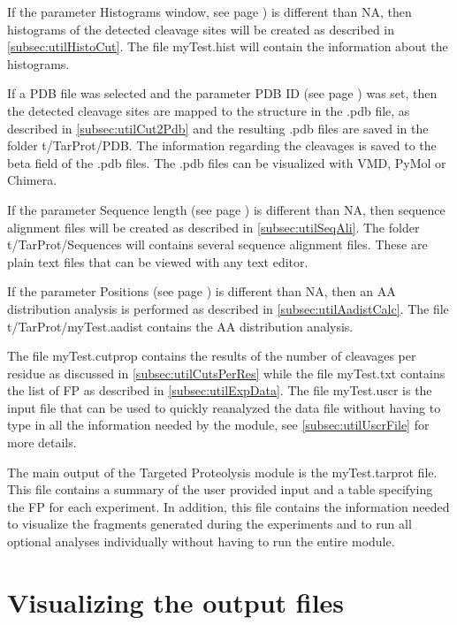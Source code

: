 If the parameter Histograms window, see page \pageref{par:tarprotHist}) is different than NA, then histograms of the detected cleavage sites will be created as described in \autoref{subsec:utilHistoCut}. The file myTest.hist will contain the information about the histograms.

If a PDB file was selected and the parameter PDB ID  (see page \pageref{par:tarprotPdbID}) was set, then the detected cleavage sites are mapped to the structure in the .pdb file, as described in \autoref{subsec:utilCut2Pdb} and the resulting .pdb files are saved in the folder t/TarProt/PDB. The information regarding the cleavages is saved to the beta field of the .pdb files. The .pdb files can be visualized with VMD, PyMol or Chimera. 
  
If the parameter Sequence length (see page \pageref{par:tarprotSeqL}) is different than NA, then sequence alignment files will be created as described in \autoref{subsec:utilSeqAli}. The folder t/TarProt/Sequences will contains several sequence alignment files. These are plain text files that can be viewed with any text editor.

If the parameter Positions (see page \pageref{par:tarprotPos}) is different than NA, then an AA distribution analysis is performed as described in \autoref{subsec:utilAadistCalc}. The file t/TarProt/myTest.aadist contains the AA distribution analysis.

The file myTest.cutprop contains the results of the number of cleavages per residue as discussed in \autoref{subsec:utilCutsPerRes} while the file myTest.txt contains the list of FP as described in \autoref{subsec:utilExpData}. The file myTest.uscr is the input file that can be used to quickly reanalyzed the data file without having to type in all the information needed by the module, see \autoref{subsec:utilUscrFile} for more details. 

The main output of the Targeted Proteolysis module is the myTest.tarprot file. This file contains a summary of the user provided input and a table specifying the FP for each experiment. In addition, this file contains the information needed to visualize the fragments generated during the experiments and to run all optional analyses individually without having to run the entire module.

\section{Visualizing the output files}

